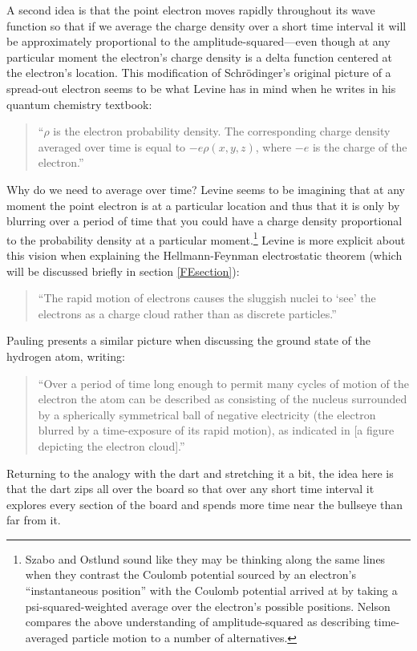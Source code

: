 \documentclass[12pt,onecolumn,secnumarabic,amsmath,amssymb,balancelastpage,nofootinbib]{article}
\begin{document}
A second idea is that the point electron moves rapidly throughout its wave function so that if we average the charge density over a short time interval it will be approximately proportional to the amplitude-squared---even though at any particular moment the electron's charge density is a delta function centered at the electron's location.  This modification of Schr\"{o}dinger's original picture of a spread-out electron seems to be what Levine has in mind when he writes in his quantum chemistry textbook:
\begin{quote}
``$\rho$ is the electron probability density.  The corresponding charge density averaged over time is equal to $-e\rho(x,y,z)$, where $-e$ is the charge of the electron.'' \cite[pg.\ 403]{levineQC}
\end{quote}
Why do we need to average over time?  Levine seems to be imagining that at any moment the point electron is at a particular location and thus that it is only by blurring over a period of time that you could have a charge density proportional to the probability density at a particular moment.\footnote{Szabo and Ostlund \cite[sec.\ 3.1.1]{szaboQC} sound like they may be thinking along the same lines when they contrast the Coulomb potential sourced by an electron's ``instantaneous position'' with the Coulomb potential arrived at by taking a psi-squared-weighted average over the electron's possible positions.  Nelson \cite{nelson1990} compares the above understanding of amplitude-squared as describing time-averaged particle motion to a number of alternatives.}  Levine is more explicit about this vision when explaining the Hellmann-Feynman electrostatic theorem (which will be discussed briefly in section \ref{FEsection}):
\begin{quote}
``The rapid motion of electrons causes the sluggish nuclei to `see' the electrons as a charge cloud rather than as discrete particles.'' \cite[pg.\ 430]{levineQC}
\end{quote}
Pauling presents a similar picture when discussing the ground state of the hydrogen atom, writing:
\begin{quote}
``Over a period of time long enough to permit many cycles of motion of the electron the atom can be described as consisting of the nucleus surrounded by a spherically symmetrical ball of negative electricity (the electron blurred by a time-exposure of its rapid motion), as indicated in [a figure depicting the electron cloud].'' \cite[pg.\ 15]{pauling1960}
\end{quote}
Returning to the analogy with the dart and stretching it a bit, the idea here is that the dart zips all over the board so that over any short time interval it explores every section of the board and spends more time near the bullseye than far from it.
\end{document}
